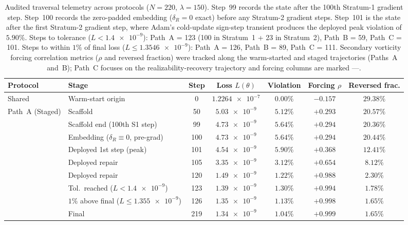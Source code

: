 \documentclass[preprint,aps,prb,longbibliography,superscriptaddress]{revtex4-2}
\newcommand{\dR}{\delta_R}
\begin{document}
\begin{table}[t]
\caption{Audited traversal telemetry across protocols ($N = 220$, $\lambda = 150$).
  Step~99 records the state after the 100th Stratum-1 gradient step.
  Step~100 records the zero-padded embedding ($\delta_R = 0$ exact) before any Stratum-2
  gradient steps. Step~101 is the state after the first Stratum-2 gradient step,
  where Adam's cold-update sign-step transient produces the deployed peak violation of $5.90\%$.
  Steps to tolerance ($L < \num{1.4e-9}$): Path~A = 123 (100 in Stratum~1 + 23 in Stratum~2),
  Path~B = 59, Path~C = 101. Steps to within $1\%$ of final loss ($L \le \num{1.3546e-9}$):
  Path~A = 126, Path~B = 89, Path~C = 111. Secondary vorticity forcing correlation metrics
  ($\rho$ and reversed fraction) were tracked along the warm-started and staged trajectories
  (Paths~A and~B); Path~C focuses on the realizability-recovery trajectory and forcing columns are marked ---.}\label{tab:telemetry}
\begin{ruledtabular}
\begin{tabular}{llccccc}
  Protocol & Stage & Step & Loss $L(\theta)$ & Violation & Forcing $\rho$ & Reversed frac. \\
  \midrule
  Shared & Warm-start origin & 0 & $\num{1.2264e-7}$ & $0.00\%$ & $-0.157$ & $29.38\%$ \\
  \midrule
  \multirow{9}{*}{Path~A (Staged)}
    & Scaffold & 50 & $\num{5.03e-9}$ & $5.12\%$ & $+0.293$ & $20.57\%$ \\
    & Scaffold end (100th S1 step) & 99 & $\num{4.73e-9}$ & $5.64\%$ & $+0.294$ & $20.36\%$ \\
    & Embedding ($\dR \equiv 0$, pre-grad) & 100 & $\num{4.73e-9}$ & $5.64\%$ & $+0.294$ & $20.44\%$ \\
    & Deployed 1st step (peak) & 101 & $\num{4.54e-9}$ & $5.90\%$ & $+0.368$ & $12.41\%$ \\
    & Deployed repair & 105 & $\num{3.35e-9}$ & $3.12\%$ & $+0.654$ & $8.12\%$ \\
    & Deployed repair & 120 & $\num{1.49e-9}$ & $1.22\%$ & $+0.988$ & $2.30\%$ \\
    & Tol.\ reached ($L < \num{1.4e-9}$) & 123 & $\num{1.39e-9}$ & $1.30\%$ & $+0.994$ & $1.78\%$ \\
    & $1\%$ above final ($L \le \num{1.355e-9}$) & 126 & $\num{1.35e-9}$ & $1.13\%$ & $+0.998$ & $1.65\%$ \\
    & Final & 219 & $\num{1.34e-9}$ & $1.04\%$ & $+0.999$ & $1.65\%$ \\

\end{tabular}
\end{ruledtabular}
\end{table}
\end{document}
